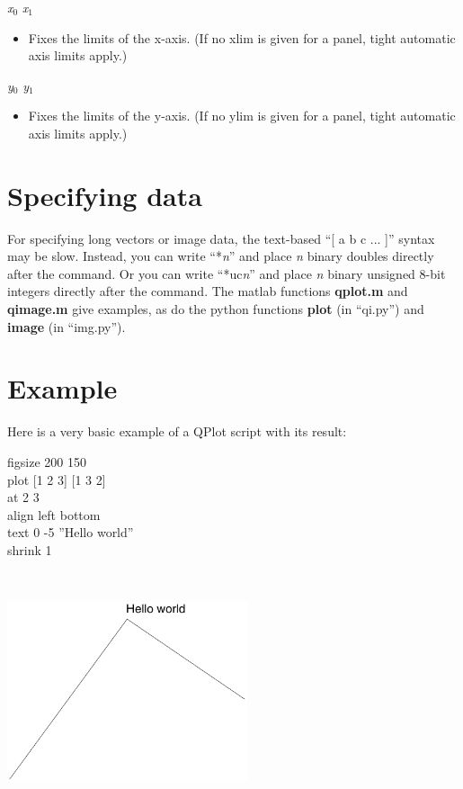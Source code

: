 \documentclass[11pt]{article}
\def\cmd#1#2{\noindent {\bf #1} #2\par}
\def\expl#1{\kern-8pt\begin{itemize}\item[]#1\end{itemize}}
\def\cref#1{{\bf #1}}
\begin{document}
\cmd{xlim}{\emph{x$_0$} \emph{x$_1$}}
\expl{Fixes the limits of the x-axis. (If no xlim is given for a panel, tight
  automatic axis limits apply.)}

\cmd{ylim}{\emph{y$_0$} \emph{y$_1$}}
\expl{Fixes the limits of the y-axis. (If no ylim is given for a panel, tight
  automatic axis limits apply.)}

\section{Specifying data}

For specifying long vectors or image data, the text-based ``[ a b
  c ... ]'' syntax may be slow. Instead, you can write
``*\emph{n}'' and place \emph{n} binary doubles directly after the
command. Or you can write ``*uc\emph{n}'' and place \emph{n} binary
unsigned 8-bit integers directly after the command. The matlab
functions \cref{qplot.m} and \cref{qimage.m} give examples, as do the
python functions \cref{plot} (in ``qi.py'') and \cref{image} (in ``img.py'').

\section{Example}

Here is a very basic example of a QPlot script with its result:\medskip

\begin{centering}\noindent%
\begin{minipage}[b]{.3\textwidth}
figsize 200 150\\
plot [1 2 3] [1 3 2]\\
at 2 3\\
align left bottom\\
text 0 -5 ''Hello world''\\
shrink 1
\end{minipage}
~
~
\begin{minipage}[b]{.45\textwidth}
\includegraphics[width=200pt]{directuse-eg}
\end{minipage}

\end{centering}
\medskip

  
\end{document}
